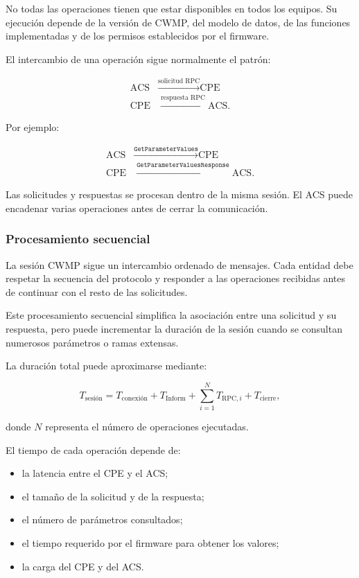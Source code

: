 No todas las operaciones tienen que estar disponibles en todos los
equipos. Su ejecución depende de la versión de CWMP, del modelo de datos,
de las funciones implementadas y de los permisos establecidos por el
firmware.

El intercambio de una operación sigue normalmente el patrón:

\[
\begin{aligned}
    \text{ACS}
    &\xrightarrow{\text{solicitud RPC}}
    \text{CPE}\\
    \text{CPE}
    &\xrightarrow{\text{respuesta RPC}}
    \text{ACS}.
\end{aligned}
\]

Por ejemplo:

\[
\begin{aligned}
    \text{ACS}
    &\xrightarrow{\texttt{GetParameterValues}}
    \text{CPE}\\
    \text{CPE}
    &\xrightarrow{\texttt{GetParameterValuesResponse}}
    \text{ACS}.
\end{aligned}
\]

Las solicitudes y respuestas se procesan dentro de la misma sesión. El
ACS puede encadenar varias operaciones antes de cerrar la comunicación.


\subsubsection*{Procesamiento secuencial}

La sesión CWMP sigue un intercambio ordenado de mensajes. Cada entidad
debe respetar la secuencia del protocolo y responder a las operaciones
recibidas antes de continuar con el resto de las solicitudes.

Este procesamiento secuencial simplifica la asociación entre una
solicitud y su respuesta, pero puede incrementar la duración de la sesión
cuando se consultan numerosos parámetros o ramas extensas.

La duración total puede aproximarse mediante:

\[
    T_{\mathrm{sesión}}
    =
    T_{\mathrm{conexión}}
    +
    T_{\mathrm{Inform}}
    +
    \sum_{i=1}^{N} T_{\mathrm{RPC},i}
    +
    T_{\mathrm{cierre}},
\]

donde \(N\) representa el número de operaciones ejecutadas.

El tiempo de cada operación depende de:

\begin{itemize}
    \item la latencia entre el CPE y el ACS;
    \item el tamaño de la solicitud y de la respuesta;
    \item el número de parámetros consultados;
    \item el tiempo requerido por el firmware para obtener los valores;
    \item la carga del CPE y del ACS.
\end{itemize}

